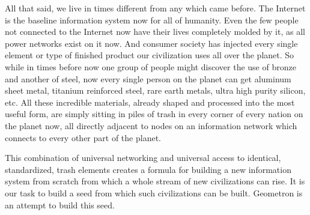\documentclass[12pt,a4paper]{amsart}
\numberwithin{equation}{section}
\begin{document}
All that said, we live in times different from any which came before.
The Internet is the baseline information system now for all of humanity.
Even the few people not connected to the Internet now have their lives
completely molded by it, as all power networks exist on it now. And
consumer society has injected every single element or type of finished
product our civilization uses all over the planet. So while in times
before now one group of people might discover the use of bronze and
another of steel, now every single person on the planet can get aluminum
sheet metal, titanium reinforced steel, rare earth metals, ultra high
purity silicon, etc. All these incredible materials, already shaped and
processed into the most useful form, are simply sitting in piles of
trash in every corner of every nation on the planet now, all directly
adjacent to nodes on an information network which connects to every
other part of the planet.

This combination of universal networking and universal access to
identical, standardized, trash elements creates a formula for building a
new information system from scratch from which a whole stream of new
civilizations can rise. It is our task to build a seed from which such
civilizations can be built. Geometron is an attempt to build this seed.
\end{document}
